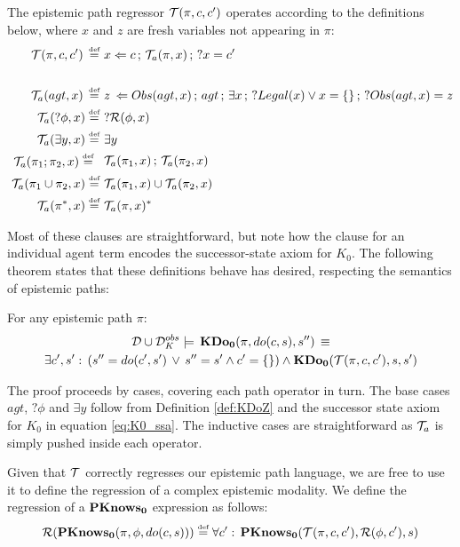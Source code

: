 \begin{defnL}
 The epistemic path regressor
$\mathcal{T}(\pi,c,c')$ operates according to the definitions below, where
$x$ and $z$ are fresh variables not appearing in $\pi$:\label{def:EpistemicPathRegression}\begin{align*}
\mathcal{T}(\pi,c,c')\,\stackrel{\mbox{\tiny def}}{=}\,\, & x\Leftarrow c\,;\,\mathcal{T}_{a}(\pi,x)\,;\,?x=c'\\
\\\mathcal{T}_{a}(agt,x)\,\stackrel{\mbox{\tiny def}}{=}\,\, & z\,\Leftarrow Obs(agt,x)\,;\, agt\,;\,\exists x\,;\,?Legal(x)\vee x=\{\}\,;\,?Obs(agt,x)=z\\
\mathcal{T}_{a}(?\phi,x)\stackrel{\mbox{\tiny def}}{=}\,\, & ?\mathcal{R}(\phi,x)\\
\mathcal{T}_{a}(\exists y,x)\stackrel{\mbox{\tiny def}}{=}\,\, & \exists y\\
\begin{array}{c}
\mathcal{T}_{a}(\pi_{1};\pi_{2},x)\stackrel{\mbox{\tiny def}}{=}\,\,\end{array} & \mathcal{T}_{a}(\pi_{1},x)\,;\,\mathcal{T}_{a}(\pi_{2},x)\\
\mathcal{T}_{a}(\pi_{1}\cup\pi_{2},x)\stackrel{\mbox{\tiny def}}{=}\,\, & \mathcal{T}_{a}(\pi_{1},x)\cup\mathcal{T}_{a}(\pi_{2},x)\\
\mathcal{T}_{a}(\pi^{*},x)\stackrel{\mbox{\tiny def}}{=}\,\, & \mathcal{T}_{a}(\pi,x)^{*}\end{align*}

\end{defnL}
Most of these clauses are straightforward, but note how the clause
for an individual agent term encodes the successor-state axiom for
$K_{0}$. The following theorem states that these definitions behave
has desired, respecting the semantics of epistemic paths:

\begin{thm}
\label{thm:Trn-respects-epi-paths}For any epistemic path $\pi$:\begin{multline*}
\mathcal{D}\cup\mathcal{D}_{K}^{obs}\models\,\mathbf{KDo_{0}}(\pi,do(c,s),s'')\,\equiv\\
\exists c',s':\,\left(s''=do(c',s')\,\vee\, s''=s'\wedge c'=\{\}\right)\wedge\mathbf{KDo_{0}}(\mathcal{T}(\pi,c,c'),s,s')\end{multline*}

\end{thm}
\begin{proofsketch}
The proof proceeds by cases, covering each path operator in turn.
The base cases $agt$, $?\phi$ and $\exists y$ follow from Definition
\ref{def:KDoZ} and the successor state axiom for $K_{0}$ in equation
\eqref{eq:K0_ssa}. The inductive cases are straightforward as $\mathcal{T}_{a}$
is simply pushed inside each operator. 
\end{proofsketch}
Given that $\mathcal{T}$ correctly regresses our epistemic path language,
we are free to use it to define the regression of a complex epistemic
modality. We define the regression of a $\mathbf{PKnows_{0}}$ expression as
follows:\[
\mathcal{R}(\mathbf{PKnows_{0}}(\pi,\phi,do(c,s)))\stackrel{\mbox{\tiny def}}{=}\forall c':\,\mathbf{PKnows_{0}}(\mathcal{T}(\pi,c,c'),\mathcal{R}(\phi,c'),s)\]


